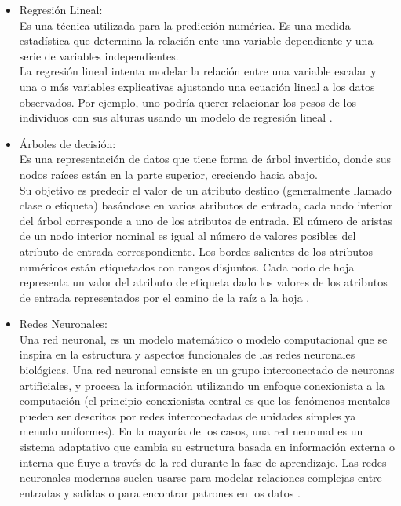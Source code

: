\begin{itemize}
	\item Regresión Lineal:\\
Es una técnica utilizada para la predicción numérica. Es una medida estadística que determina la relación ente una variable dependiente y una serie de variables independientes.\\
La regresión lineal intenta modelar la relación entre una variable escalar y una o más variables explicativas ajustando una ecuación lineal a los datos observados. Por ejemplo, uno podría querer relacionar los pesos de los individuos con sus alturas usando un modelo de regresión lineal \cite{rl}.

	\item Árboles de decisión:\\

Es una representación de datos que tiene forma de árbol invertido, donde sus nodos raíces están en la parte superior, creciendo hacia abajo.\\
Su objetivo es predecir el valor de un atributo destino (generalmente llamado clase o etiqueta) basándose en varios atributos de entrada, cada nodo interior del árbol corresponde a uno de los atributos de entrada. El número de aristas de un nodo interior nominal es igual al número de valores posibles del atributo de entrada correspondiente. Los bordes salientes de los atributos numéricos están etiquetados con rangos disjuntos. Cada nodo de hoja representa un valor del atributo de etiqueta dado los valores de los atributos de entrada representados por el camino de la raíz a la hoja \cite{ad}.
	\item Redes Neuronales:\\

Una red neuronal, es un modelo matemático o modelo computacional que se inspira en la estructura y aspectos funcionales de las redes neuronales biológicas. Una red neuronal consiste en un grupo interconectado de neuronas artificiales, y procesa la información utilizando un enfoque conexionista a la computación (el principio conexionista central es que los fenómenos mentales pueden ser descritos por redes interconectadas de unidades simples ya menudo uniformes). En la mayoría de los casos, una red neuronal es un sistema adaptativo que cambia su estructura basada en información externa o interna que fluye a través de la red durante la fase de aprendizaje. Las redes neuronales modernas suelen usarse para modelar relaciones complejas entre entradas y salidas o para encontrar patrones en los datos \cite{redn}.


\end{itemize}
